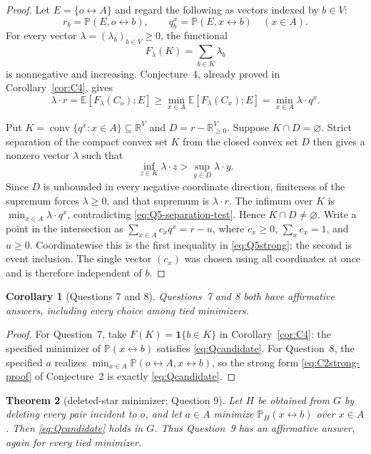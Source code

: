 \documentclass[11pt]{article}
\newtheorem{theorem}{Theorem}[section]
\newtheorem{corollary}[theorem]{Corollary}
\theoremstyle{definition}
\theoremstyle{remark}
\newcommand{\PP}{\mathbb P}
\newcommand{\EE}{\mathbb E}
\newcommand{\one}{\mathbf 1}
\newcommand{\con}{\leftrightarrow}
\begin{document}
\begin{proof}
Let $E=\{o\con A\}$ and regard the following as vectors indexed by
$b\in V$:
\[
 r_b=\PP(E,o\con b),\qquad q_b^x=\PP(E,x\con b)\quad(x\in A).
\]
For every vector $\lambda=(\lambda_b)_{b\in V}\geq0$, the functional
\[
 F_\lambda(K)=\sum_{b\in K}\lambda_b
\]
is nonnegative and increasing.  Conjecture~4, already proved in
Corollary~\ref{cor:C4}, gives
\begin{equation}\label{eq:Q5-separation-test}
 \lambda\mathbin{\cdot}r
 =\EE[F_\lambda(C_o);E]
 \geq\min_{x\in A}\EE[F_\lambda(C_x);E]
 =\min_{x\in A}\lambda\mathbin{\cdot}q^x.
\end{equation}

Put $K=\operatorname{conv}\{q^x:x\in A\}\subseteq\mathbb R^V$ and
$D=r-\mathbb R_{\geq0}^{V}$.  Suppose $K\cap D=\varnothing$.  Strict
separation of the compact convex set $K$ from the closed convex set $D$
then gives a nonzero vector $\lambda$ such that
\[
 \inf_{z\in K}\lambda\mathbin{\cdot}z
 >\sup_{y\in D}\lambda\mathbin{\cdot}y.
\]
Since $D$ is unbounded in every negative coordinate direction, finiteness
of the supremum forces $\lambda\geq0$, and that supremum is
$\lambda\mathbin{\cdot}r$.  The infimum over $K$ is
$\min_{x\in A}\lambda\mathbin{\cdot}q^x$, contradicting
\eqref{eq:Q5-separation-test}.  Hence $K\cap D\ne\varnothing$.
Write a point in the intersection as
$\sum_{x\in A}c_x q^x=r-u$, where $c_x\geq0$, $\sum_x c_x=1$, and
$u\geq0$.  Coordinatewise this is the first inequality in
\eqref{eq:Q5strong}; the second is event inclusion.  The single vector
$(c_x)$ was chosen using all coordinates at once and is therefore
independent of $b$.
\end{proof}

\begin{corollary}[Questions 7 and 8]\label{cor:Q78}
Questions~7 and 8 both have affirmative answers, including every choice
among tied minimizers.
\end{corollary}

\begin{proof}
For Question~7, take $F(K)=\one\{b\in K\}$ in
Corollary~\ref{cor:C4}: the specified minimizer of
$\PP(x\con b)$ satisfies \eqref{eq:Qcandidate}.  For Question~8, the
specified $a$ realizes
$\min_{x\in A}\PP(o\con A,x\con b)$, so the strong form
\eqref{eq:C2strong-proof} of Conjecture~2 is exactly
\eqref{eq:Qcandidate}.
\end{proof}

\begin{theorem}[deleted-star minimizer; Question 9]\label{thm:Q9}
Let $H$ be obtained from $G$ by deleting every pair incident to $o$, and
let $a\in A$ minimize $\PP_H(x\con b)$ over $x\in A$.  Then
\eqref{eq:Qcandidate} holds in $G$.  Thus Question~9 has an affirmative
answer, again for every tied minimizer.
\end{theorem}
\end{document}
